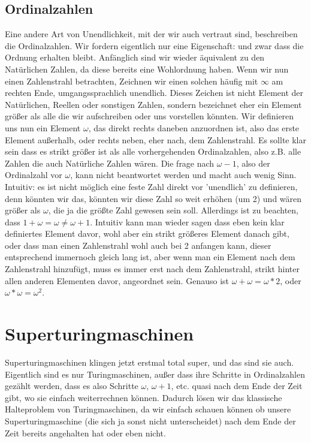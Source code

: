 \documentclass{scrartcl}
\begin{document}
\subsection{Ordinalzahlen}
Eine andere Art von Unendlichkeit, mit der wir auch vertraut sind, beschreiben
die Ordinalzahlen.  Wir fordern eigentlich nur eine Eigenschaft: und zwar dass
die Ordnung erhalten bleibt. Anfänglich sind wir wieder äquivalent zu den
Natürlichen Zahlen, da diese bereits eine Wohlordnung haben. Wenn wir nun einen
Zahlenstrahl betrachten, Zeichnen wir einen solchen häufig mit $\infty$ am
rechten Ende, umgangssprachlich unendlich. Dieses Zeichen ist nicht Element der
Natürlichen, Reellen oder sonstigen Zahlen, sondern bezeichnet eher ein Element
größer als alle die wir aufschreiben oder uns vorstellen könnten. Wir
definieren uns nun ein Element $\omega$, das direkt rechts daneben anzuordnen
ist, also das erste Element außerhalb, oder rechts neben, eher nach, dem
Zahlenstrahl. Es sollte klar sein dass es strikt größer ist als alle
vorhergehenden Ordinalzahlen, also z.B. alle Zahlen die auch Natürliche Zahlen
wären. Die frage nach $\omega - 1$, also der Ordinalzahl vor $\omega$, kann
nicht beantwortet werden und macht auch wenig Sinn. Intuitiv: es ist nicht
möglich eine feste Zahl direkt vor 'unendlich' zu definieren, denn könnten wir
das, könnten wir diese Zahl so weit erhöhen (um 2) und wären größer als
$\omega$, die ja die größte Zahl gewesen sein soll. Allerdings ist zu beachten,
dass $1 + \omega = \omega \neq \omega + 1$. Intuitiv kann man wieder sagen dass
eben kein klar definiertes Element davor, wohl aber ein strikt größeres Element
danach gibt, oder dass man einen Zahlenstrahl wohl auch bei 2 anfangen kann,
dieser entsprechend immernoch gleich lang ist, aber wenn man ein Element nach
dem Zahlenstrahl hinzufügt, muss es immer erst nach dem Zahlenstrahl, strikt
hinter allen anderen Elementen davor, angeordnet sein. Genauso ist $\omega +
\omega = \omega * 2$, oder $\omega * \omega = \omega ^ 2$.


\section{Superturingmaschinen}
Superturingmaschinen klingen jetzt erstmal total super, und das sind sie auch.
Eigentlich sind es nur Turingmaschinen, außer dass ihre Schritte in
Ordinalzahlen gezählt werden, dass es also Schritte $\omega$, $\omega + 1$,
etc. quasi nach dem Ende der Zeit gibt, wo sie einfach weiterrechnen können.
Dadurch lösen wir das klassische Halteproblem von Turingmaschinen, da wir
einfach schauen können ob unsere Superturingmaschine (die sich ja sonst nicht
unterscheidet) nach dem Ende der Zeit bereits angehalten hat oder eben nicht.
\end{document}
